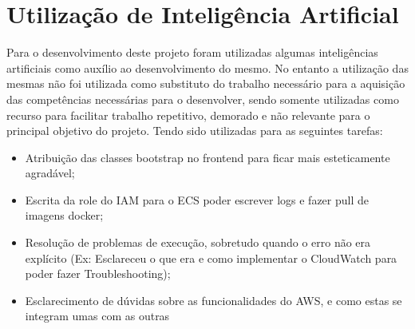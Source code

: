\section{Utilização de Inteligência Artificial}
Para o desenvolvimento deste projeto foram utilizadas algumas inteligências artificiais como auxílio ao desenvolvimento do mesmo. No entanto a utilização das mesmas não foi utilizada como substituto do trabalho necessário para a aquisição das competências necessárias para o desenvolver, sendo somente utilizadas como recurso para facilitar trabalho repetitivo, demorado e não relevante para o principal objetivo do projeto. Tendo sido utilizadas para as seguintes tarefas:

\begin{itemize}
	\item Atribuição das classes bootstrap no frontend para ficar mais esteticamente agradável;
	\item Escrita da role do IAM para o ECS poder escrever logs e fazer pull de imagens docker;
	\item Resolução de problemas de execução, sobretudo quando o erro não era explícito (Ex: Esclareceu o que era e como implementar o CloudWatch para poder fazer Troubleshooting);
	\item Esclarecimento de dúvidas sobre as funcionalidades do AWS, e como estas se integram umas com as outras
\end{itemize}